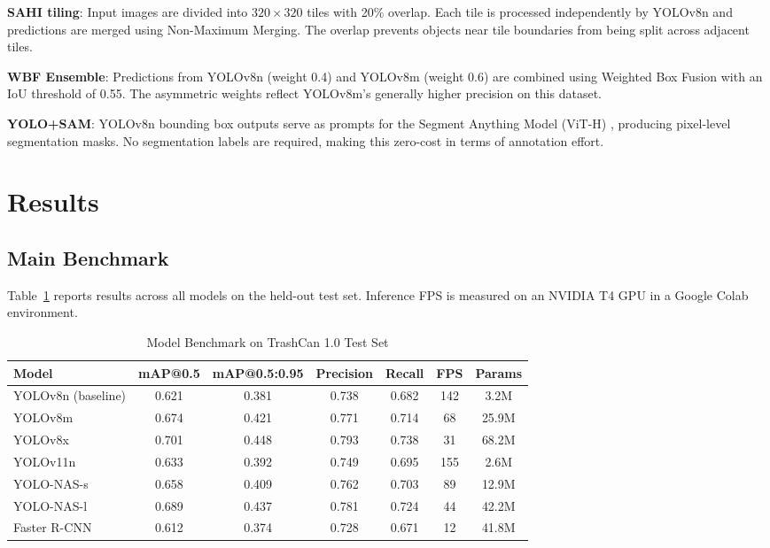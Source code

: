 \documentclass[conference]{IEEEtran}
\begin{document}
\textbf{SAHI tiling}: Input images are divided into $320 \times 320$
tiles with 20\% overlap. Each tile is processed independently by YOLOv8n
and predictions are merged using Non-Maximum Merging. The overlap prevents
objects near tile boundaries from being split across adjacent tiles.

\textbf{WBF Ensemble}: Predictions from YOLOv8n (weight 0.4) and YOLOv8m
(weight 0.6) are combined using Weighted Box Fusion \cite{b8} with an IoU
threshold of 0.55. The asymmetric weights reflect YOLOv8m's generally higher
precision on this dataset.

\textbf{YOLO+SAM}: YOLOv8n bounding box outputs serve as prompts for
the Segment Anything Model (ViT-H) \cite{b6}, producing pixel-level
segmentation masks. No segmentation labels are required, making this
zero-cost in terms of annotation effort.


\section{Results}

\subsection{Main Benchmark}

Table~\ref{tab:main_results} reports results across all models on the
held-out test set. Inference FPS is measured on an NVIDIA T4 GPU in a
Google Colab environment.

\begin{table}[htbp]
\caption{Model Benchmark on TrashCan 1.0 Test Set}
\label{tab:main_results}
\begin{center}
\begin{tabular}{lcccccc}
\toprule
\textbf{Model} & \textbf{mAP@0.5} & \textbf{mAP@0.5:0.95}
               & \textbf{Precision} & \textbf{Recall}
               & \textbf{FPS} & \textbf{Params} \\
\midrule
YOLOv8n (baseline) & 0.621 & 0.381 & 0.738 & 0.682 & 142 & 3.2M \\
YOLOv8m            & 0.674 & 0.421 & 0.771 & 0.714 &  68 & 25.9M \\
YOLOv8x            & 0.701 & 0.448 & 0.793 & 0.738 &  31 & 68.2M \\
YOLOv11n           & 0.633 & 0.392 & 0.749 & 0.695 & 155 &  2.6M \\
YOLO-NAS-s         & 0.658 & 0.409 & 0.762 & 0.703 &  89 & 12.9M \\
YOLO-NAS-l         & 0.689 & 0.437 & 0.781 & 0.724 &  44 & 42.2M \\
Faster R-CNN       & 0.612 & 0.374 & 0.728 & 0.671 &  12 & 41.8M \\
\bottomrule
\end{tabular}
\end{center}
\end{table}
\end{document}
